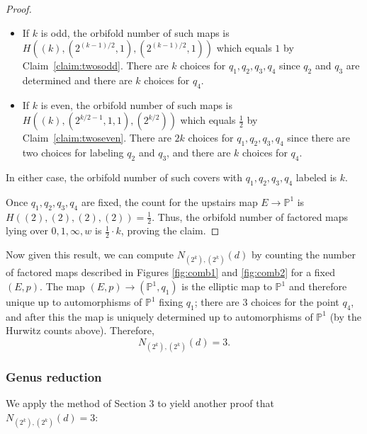 \documentclass[11pt]{article}           %
\renewcommand{\P}{\mathbb P}
\theoremstyle{definition}
\begin{document}
\begin{proof}
  \begin{itemize}
  \item If $k$ is odd, the orbifold number of such maps is $H((k),(2^{(k-1)/2},1),(2^{(k-1)/2},1))$ which
    equals $1$ by Claim~\ref{claim:twosodd}. There are $k$ choices for $q_1,q_2,q_3,q_4$
    since $q_2$ and $q_3$ are determined and there are $k$ choices for $q_4$.
  \item If $k$ is even, the orbifold number of such maps is $H((k),(2^{k/2-1},1,1),(2^{k/2}))$ which equals $\frac 12$ by Claim~\ref{claim:twoseven}. There are $2k$ choices for $q_1,q_2,q_3,q_4$
    since there are two choices for labeling $q_2$ and $q_3$, and there are $k$ choices for
    $q_4$.
  \end{itemize}
  In either case, the orbifold number of such covers with $q_1,q_2,q_3,q_4$ labeled is $k$.

  Once $q_1,q_2,q_3,q_4$ are fixed, the count for the upstairs map $E\to\P^1$ is
  $H((2),(2),(2),(2))=\frac 12$. Thus, the orbifold number of factored maps lying over $0,1,\infty,w$ is $\frac 12\cdot k$, proving the claim.
  
\end{proof}

Now given this result, we can compute $N_{(2^k),(2^k)}(d)$ by counting
the number of factored maps described in Figures \ref{fig:comb1} and \ref{fig:comb2} for a fixed $(E,p)$.
The map $(E,p)\to(\P^1,q_1)$ is the elliptic map to $\P^1$ and therefore unique up
to automorphisms of $\P^1$ fixing $q_1$; there are $3$ choices for the point
$q_4$, and after this the map is uniquely determined up to automorphisms of
$\P^1$ (by the Hurwitz counts above). Therefore,
\[
N_{(2^k),(2^k)}(d)=3.
\]

\subsubsection{Genus reduction}

We apply the method of Section 3 to yield another proof that
$N_{(2^k),(2^k)}(d)=3$:
\end{document}
